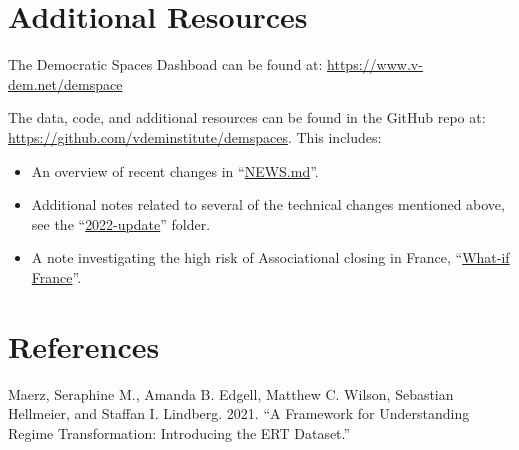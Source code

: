 \documentclass[
  11pt,
]{article}
\providecommand{\tightlist}{%
  \setlength{\itemsep}{0pt}\setlength{\parskip}{0pt}}
\newlength{\cslhangindent}
\newlength{\cslentryspacingunit} %
\newenvironment{CSLReferences}[2] %
 {%
  \setlength{\parindent}{0pt}
  \ifodd #1
  \let\oldpar\par
  \def\par{\hangindent=\cslhangindent\oldpar}
  \fi
  \setlength{\parskip}{#2\cslentryspacingunit}
 }%
 {}
\begin{document}
\hypertarget{additional-resources}{%
\section{Additional Resources}\label{additional-resources}}

The Democratic Spaces Dashboad can be found at:
\url{https://www.v-dem.net/demspace}

The data, code, and additional resources can be found in the GitHub repo
at: \url{https://github.com/vdeminstitute/demspaces}. This includes:

\begin{itemize}
\tightlist
\item
  An overview of recent changes in
  ``\href{https://github.com/vdeminstitute/demspaces/blob/main/NEWS.md}{NEWS.md}''.
\item
  Additional notes related to several of the technical changes mentioned
  above, see the
  ``\href{https://github.com/vdeminstitute/demspaces/tree/main/2022-update}{2022-update}''
  folder.
\item
  A note investigating the high risk of Associational closing in France,
  ``\href{https://github.com/vdeminstitute/demspaces/blob/main/2022-update/whatif-france.md}{What-if
  France}''.
\end{itemize}

\hypertarget{references}{%
\section*{References}\label{references}}

\hypertarget{refs}{}
\begin{CSLReferences}{1}{0}
\leavevmode{}%
Maerz, Seraphine M., Amanda B. Edgell, Matthew C. Wilson, Sebastian
Hellmeier, and Staffan I. Lindberg. 2021. {``A Framework for
Understanding Regime Transformation: Introducing the ERT Dataset.''}

\end{CSLReferences}
\end{document}
